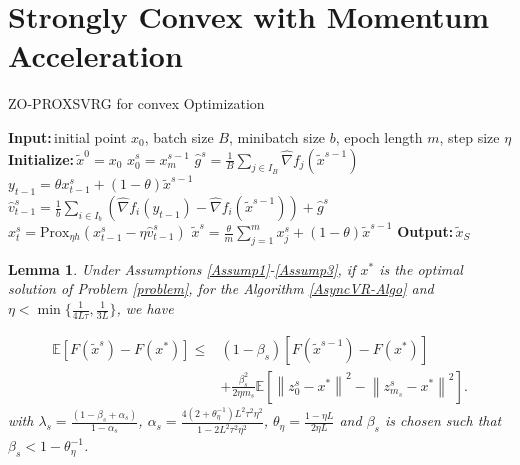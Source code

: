 \documentclass{article}
\newcommand*{\Po}{\text{Prox}}
\newcommand*{\E}{\mathbb{E}}
\newcommand{\norm}[1]{\left\lVert#1\right\rVert}
\newcommand{\Initialize}{\textbf{Initialize:}{\,}}
\newcommand{\Input}{\textbf{Input:}{\,}}
\newcommand{\Output}{\textbf{Output:}{\,}}
\newtheorem{lemma}[theorem]{Lemma}
\theoremstyle{definition}
\theoremstyle{remark}
\begin{document}
\section{Strongly Convex with Momentum Acceleration}
\begin{algorithm}\label{APGconvex-Algo}
\caption{ZO-PROXSVRG for convex Optimization}\begin{algorithmic}[1]
\State\Input initial point $x_0$, batch size $B$, minibatch size $b$, epoch length $m$, step size $\eta$
\State\Initialize $\tilde{x}^0 = x_0$
\State $x_0^s = {x}_m^{s-1}$
\State $\hat{g}^s = \frac{1}{B} \sum_{j\in I_B} \hat{\nabla} f_j (\widetilde{x}^{s-1})$
\State $y_{t-1} = \theta x_{t-1}^s+(1-\theta)\widetilde{x}^{s-1}$
\State $\hat{v}_{t-1}^s = \frac{1}{b} \sum_{i\in I_b}\left(\hat{\nabla} f_{i}(y_{t-1})-\hat{\nabla} f_{i}(\tilde{x}^{s-1})\right)+\hat{g}^s$
\State $x_{t}^s= \Po_{\eta h}(x_{t-1}^s - \eta \hat{v}_{t-1}^s)$
\EndFor
\State $\tilde{x}^s=\frac{\theta}{m}\sum_{j=1}^{m}x_j^s + (1-\theta)\tilde{x}^{s-1}$ 
 \EndFor
 \State\Output ${\tilde{x}}_{S}$
\end{algorithmic}
\end{algorithm}
\begin{lemma}\label{lemma1}
Under Assumptions \ref{Assump1}-\ref{Assump3}, if $x^*$ is the optimal solution of Problem \eqref{problem}, for the Algorithm \ref{AsyncVR-Algo} and $\eta < \min\{\frac{1}{4L
\tau}, \frac{1}{3L}\}$, we have 

\begin{equation}
\begin{split}
\E[F(\widetilde{x}^s)-F(x^*)] \leq &(1-\beta_s)[F(\widetilde{x}^{s-1})-F(x^*)] \\
&+ {\frac{ \beta_s^2}{2\eta m_s}}\E[\norm{z_{0}^s-x^*}^2-\norm{z_{m_s}^s-x^*}^2]. 
\end{split}
\end{equation}
with $\lambda_s = \frac{(1-\beta_s+\alpha_s)}{1-\alpha_s}$, $\alpha_s=\frac{4(2+\theta_{\eta}^{-1})L^2\tau^2\eta^2}{1-2L^2 \tau^2\eta^2}$, $\theta_{\eta} = \frac{1-\eta L}{2\eta L}$ and $\beta_s$ is chosen such that $\beta_s < 1-\theta_{\eta}^{-1}$.
\end{lemma}
\end{document}
